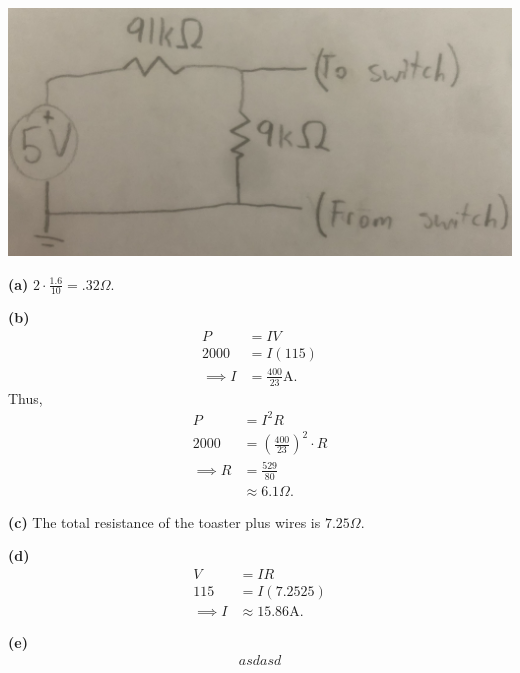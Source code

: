\documentclass{article}
\begin{document}

    \begin{center}
    \includegraphics[scale=.1]{switch_circuit.jpg}
    \end{center}


{\bf (a)} $2\cdot\frac{1.6}{10}=.32\Omega$.

\medskip
{\bf (b)}
\begin{align*}
    P &= IV \\
    2000 &= I(115) \\
    \implies I &= \frac{400}{23}\text{A}.
\end{align*}
Thus,
\begin{align*}
    P &= I^2R \\
    2000 &= \left(\frac{400}{23}\right)^2 \cdot R \\
    \implies R &= \frac{529}{80} \\
    &\approx 6.1\Omega.
\end{align*}

\medskip
{\bf (c)} The total resistance of the toaster plus wires is $7.25\Omega$.

\medskip
{\bf (d)}
\begin{align*}
    V &= IR \\
    115 &= I(7.2525) \\
    \implies I &\approx 15.86\text{A}.
\end{align*}

\medskip
{\bf (e)}
\begin{align*}
    asdasd
\end{align*}
\end{document}
